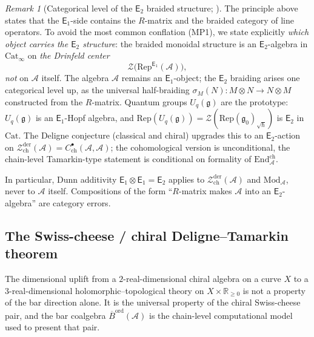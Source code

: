 \documentclass[11pt,reqno]{amsart}
\theoremstyle{definition}
\theoremstyle{remark}
\newtheorem{remark}[theorem]{Remark}
\newcommand{\cA}{\mathcal{A}}
\newcommand{\cZ}{\mathcal{Z}}
\newcommand{\Eone}{\mathsf{E}_{1}}
\newcommand{\Etwo}{\mathsf{E}_{2}}
\newcommand{\fg}{\mathfrak{g}}
\newcommand{\Barord}{\overline{B}^{\mathrm{ord}}}
\newcommand{\RR}{\mathbb{R}}
\numberwithin{equation}{section}
\begin{document}
\begin{remark}[Categorical level of the $\Etwo$ braided structure; ]
\label{rem:e2-lives-on-center}
The principle above states that the $\Eone$-side contains the
$R$-matrix and the braided category of line operators. To avoid the
most common conflation (MP1), we state explicitly \emph{which
object carries the $\Etwo$ structure}: the braided monoidal structure
is an $\Etwo$-algebra in $\mathrm{Cat}_\infty$ on
\emph{the Drinfeld center}
\[
  \cZ\!\bigl(\mathrm{Rep}^{\Eone}(\cA)\bigr),
\]
\emph{not} on $\cA$ itself. The algebra $\cA$ remains an $\Eone$-object;
the $\Etwo$ braiding arises one categorical level up, as the universal
half-braiding $\sigma_M(N)\colon M\otimes N\to N\otimes M$ constructed
from the $R$-matrix. Quantum groups $U_q(\fg)$ are the prototype: $U_q(\fg)$
is an $\Eone$-Hopf algebra, and
$\mathrm{Rep}(U_q(\fg))=\cZ(\mathrm{Rep}(\fg_0)_{\!\!\sqrt{\hbar}})$ is
$\Etwo$ in $\mathrm{Cat}$. The Deligne conjecture (classical and chiral)
upgrades this to an $\Etwo$-action on $\cZ_{\mathrm{ch}}^{\mathrm{der}}(\cA)
=C^\bullet_{\mathrm{ch}}(\cA,\cA)$; the cohomological version is
unconditional, the chain-level Tamarkin-type statement is conditional
on formality of $\mathrm{End}^{\mathrm{ch}}_\cA$.

In particular, Dunn additivity $\Eone\otimes\Eone=\Etwo$ applies to
$\cZ^{\mathrm{der}}_{\mathrm{ch}}(\cA)$ and $\mathrm{Mod}_\cA$, never
to $\cA$ itself. Compositions of the form ``$R$-matrix makes $\cA$ into
an $\Etwo$-algebra'' are category errors.
\end{remark}

\subsection{The Swiss-cheese / chiral Deligne--Tamarkin theorem}
\label{subsec:swiss-cheese-chiral-DT}

The dimensional uplift from a $2$-real-dimensional chiral algebra
on a curve $X$ to a $3$-real-dimensional holomorphic--topological
theory on $X \times \RR_{\geq 0}$ is not a property of the bar
direction alone. It is the universal property of the chiral
Swiss-cheese pair, and the bar coalgebra $\Barord(\cA)$ is the
chain-level computational model used to present that pair.
\end{document}
